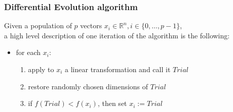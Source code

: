 \documentclass{beamer}
\begin{document}
\begin{frame}
\frametitle{Differential Evolution algorithm}
  Given a population of $p$ vectors $x_i \in \mathbb{R}^n, i \in \{0, \dots, p-1\}$,\\
  a high level description of one iteration of the algorithm is the following:
  \begin{itemize}
    \item for each $x_i$:
    \begin{enumerate}
      \item apply to $x_i$ a linear transformation and call it $Trial$
      \item restore randomly chosen dimensions of $Trial$
      \item if $f(Trial) < f(x_i)$, then set $x_i := Trial$
    \end{enumerate}
  \end{itemize}
\end{frame}
\end{document}
